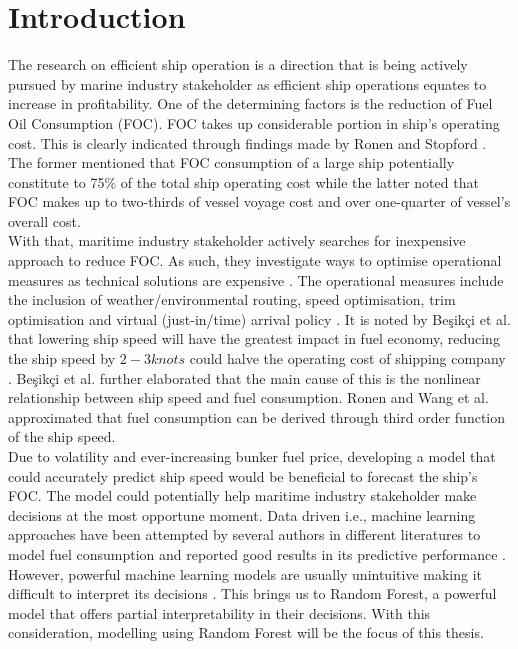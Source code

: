 \section{Introduction} \label{introduction}

The research on efficient ship operation is a direction that is being actively pursued by marine industry stakeholder as efficient ship operations equates to increase in profitability. One of the determining factors is the reduction of Fuel Oil Consumption (FOC). FOC takes up considerable portion in ship's operating cost. This is clearly indicated through findings made by Ronen \cite{Ronen.2011} and Stopford \cite{Stopford.2009}. The former mentioned that FOC consumption of a large ship potentially constitute to 75\% of the total ship operating cost while the latter noted that FOC makes up to two-thirds of vessel voyage cost and over one-quarter of vessel's overall cost. \\

With that, maritime industry stakeholder actively searches for inexpensive approach to reduce FOC. As such, they investigate ways to optimise operational measures as technical solutions are expensive \cite{Li.2022}. The operational measures include the inclusion of weather/environmental routing, speed optimisation, trim optimisation and virtual (just-in/time) arrival policy \cite{Li.2022}. It is noted by {Be{\c{s}}ik{\c{c}}i} et al. \cite{BalBesikci.2016} that lowering ship speed will have the greatest impact in fuel economy, reducing the ship speed by $2-3 knots$  could halve the operating cost of shipping company \cite{Stopford.2009,Wijnolst.2009}. {Be{\c{s}}ik{\c{c}}i} et al. further elaborated that the main cause of this is the nonlinear relationship between ship speed and fuel consumption. Ronen \cite{Ronen.1982,Ronen.2011} and Wang et al. \cite{Wang.2012} approximated that fuel consumption can be derived through third order function of the ship speed. \\

Due to volatility and ever-increasing bunker fuel price, developing a model that could accurately predict ship speed would be beneficial to forecast the ship's FOC. The model could potentially help maritime industry stakeholder make decisions at the most opportune moment. Data driven i.e., machine learning approaches have been attempted by several authors in different literatures to model fuel consumption and reported good results in its predictive performance \cite{BalBesikci.2016,Jeon.2018,Gkerekos.2019,Abebe.2020,Kim.2021}. However, powerful machine learning models are usually unintuitive making it difficult to interpret its decisions \cite{Geron.2019}. This brings us to Random Forest, a powerful model that offers partial interpretability in their decisions. With this consideration, modelling using Random Forest will be the focus of this thesis.


